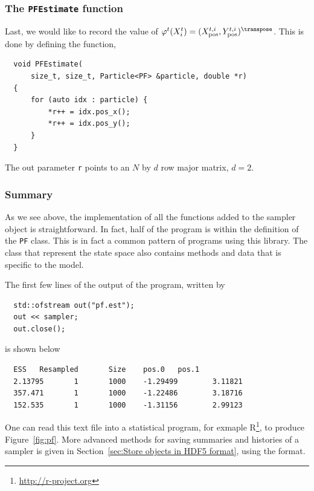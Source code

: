 \subsubsection{The \texttt{PFEstimate} function}

Last, we would like to record the value of $\varphi^t(X_i^t) =
(\xpos^{t,i},\ypos^{t,i})^{\transpose}$. This is done by defining the function,
\begin{Verbatim}
  void PFEstimate(
      size_t, size_t, Particle<PF> &particle, double *r)
  {
      for (auto idx : particle) {
          *r++ = idx.pos_x();
          *r++ = idx.pos_y();
      }
  }
\end{Verbatim}
The out parameter \verb|r| points to an $N$ by $d$ row major matrix, $d = 2$.

\subsubsection{Summary}

As we see above, the implementation of all the functions added to the sampler
object is straightforward. In fact, half of the program is within the
definition of the \verb|PF| class. This is in fact a common pattern of programs
using this library. The class that represent the state space also contains
methods and data that is specific to the model.

The first few lines of the output of the program, written by
\begin{Verbatim}
  std::ofstream out("pf.est");
  out << sampler;
  out.close();
\end{Verbatim}
is shown below
\begin{Verbatim}
  ESS   Resampled       Size    pos.0   pos.1
  2.13795       1       1000    -1.29499        3.11821
  357.471       1       1000    -1.22486        3.18716
  152.535       1       1000    -1.31156        2.99123
\end{Verbatim}
One can read this text file into a statistical program, for exmaple
R\footnote{\url{http://r-project.org}}, to produce Figure~\ref{fig:pf}. More
advanced methods for saving summaries and histories of a sampler is given in
Section~\ref{sec:Store objects in HDF5 format}, using the \hdf format.

